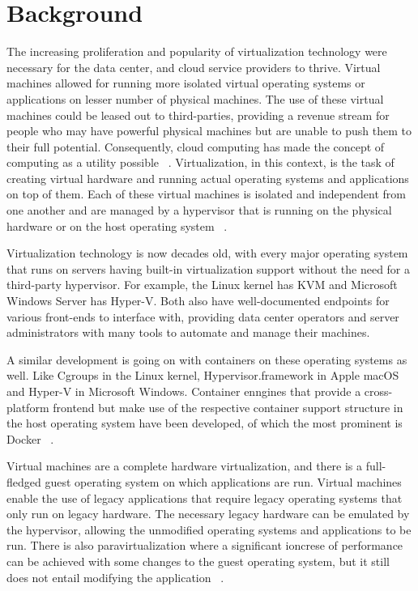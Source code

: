 \documentclass[10pt,twocolumn]{article}
\begin{document}
\section{Background}

The increasing proliferation and popularity of virtualization technology were necessary for the data center, and cloud service providers to thrive.
Virtual machines allowed for running more isolated virtual operating systems or applications on lesser number of physical machines.
The use of these virtual machines could be leased out to third-parties, providing a revenue stream for people who may have powerful physical machines but are unable to push them to their full potential.
Consequently, cloud computing has made the concept of computing as a utility possible ~\cite{berkeley_cloud}.
Virtualization, in this context, is the task of creating virtual hardware and running actual operating systems and applications on top of them.
Each of these virtual machines is isolated and independent from one another and are managed by a hypervisor that is running on the physical hardware or on the host operating system ~\cite{xen}.

Virtualization technology is now decades old, with every major operating system that runs on servers having built-in virtualization support without the need for a third-party hypervisor.
For example, the Linux kernel has KVM and Microsoft Windows Server has Hyper-V.
Both also have well-documented endpoints for various front-ends to interface with, providing data center operators and server administrators with many tools to automate and manage their machines.

A similar development is going on with containers on these operating systems as well. Like Cgroups in the Linux kernel, Hypervisor.framework in Apple macOS and Hyper-V in Microsoft Windows.
Container enngines that provide a cross-platform frontend but make use of the respective container support structure in the host operating system have been developed, of which the most prominent is Docker ~\cite{intro_docker}.

Virtual machines are a complete hardware virtualization, and there is a full-fledged guest operating system on which applications are run. Virtual machines enable the use of legacy applications that require legacy operating systems that only run on legacy hardware.
The necessary legacy hardware can be emulated by the hypervisor, allowing the unmodified operating systems and applications to be run.
There is also paravirtualization where a significant ioncrese of performance can be achieved with some changes to the guest operating system, but it still does not entail modifying the application ~\cite{xen}.
\end{document}
